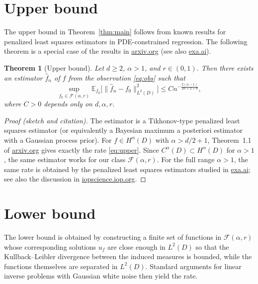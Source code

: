 \documentclass[11pt]{article}
\newtheorem{theorem}{Theorem}[section]
\theoremstyle{definition}
\theoremstyle{remark}
\newcommand{\E}{\mathbb{E}}
\newcommand{\F}{\mathcal{F}}
\begin{document}
\section{Upper bound}

The upper bound in Theorem~\ref{thm:main} follows from known results for penalized least squares estimators in PDE-constrained regression. The following theorem is a special case of the results in \href{https://arxiv.org/html/2601.09007}{arxiv.org} (see also \href{https://exa.ai/library/publication/rj7jk1yjt53}{exa.ai}).

\begin{theorem}[Upper bound]\label{thm:upper}
Let \(d\ge 2\), \(\alpha>1\), and \(r\in(0,1)\). Then there exists an estimator \(\hat f_n\) of \(f\) from the observation \eqref{eq:obs} such that
\begin{equation}\label{eq:upper}
\sup_{f_0\in \F(\alpha,r)}
\E_{f_0}\bigl[\|\hat f_n-f_0\|_{L^2(D)}^2\bigr]
\le C n^{-\frac{2(\alpha-1)}{2\alpha+2+d}},
\end{equation}
where \(C>0\) depends only on \(d,\alpha,r\).
\end{theorem}

\begin{proof}[Proof (sketch and citation)]
The estimator is a Tikhonov-type penalized least squares estimator (or equivalently a Bayesian maximum a posteriori estimator with a Gaussian process prior). For \(f\in H^\alpha(D)\) with \(\alpha>d/2+1\), Theorem~1.1 of \href{https://arxiv.org/html/2601.09007}{arxiv.org} gives exactly the rate \eqref{eq:upper}. Since \(C^\alpha(D)\subset H^\alpha(D)\) for \(\alpha>1\), the same estimator works for our class \(\F(\alpha,r)\). For the full range \(\alpha>1\), the same rate is obtained by the penalized least squares estimators studied in \href{https://exa.ai/library/publication/rj7jk1yjt53}{exa.ai}; see also the discussion in \href{https://google.iopscience.iop.org/article/10.1088/1361-6420/ab7d2a}{iopscience.iop.org}. 
\end{proof}

\section{Lower bound}

The lower bound is obtained by constructing a finite set of functions in \(\F(\alpha,r)\) whose corresponding solutions \(u_f\) are close enough in \(L^2(D)\) so that the Kullback--Leibler divergence between the induced measures is bounded, while the functions themselves are separated in \(L^2(D)\). Standard arguments for linear inverse problems with Gaussian white noise then yield the rate.
\end{document}
